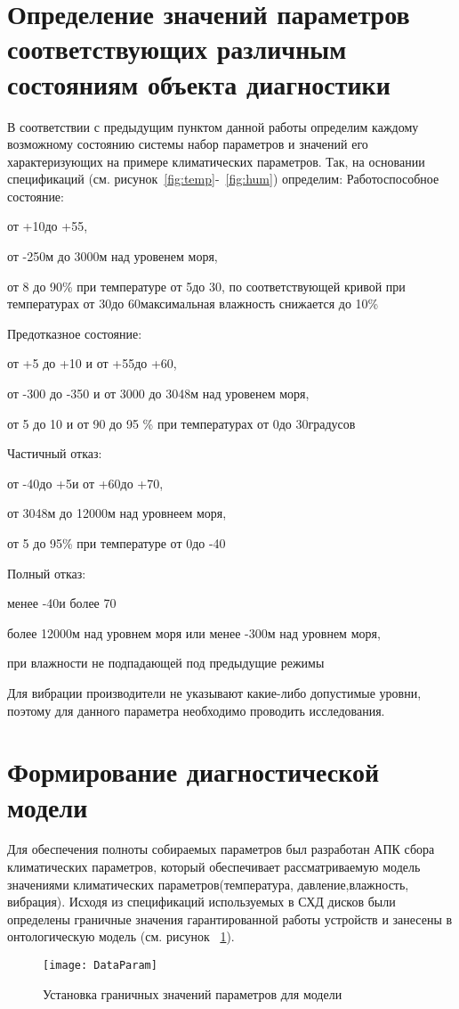 \section{Определение значений параметров соответствующих различным состояниям объекта диагностики}
В соответствии с предыдущим пунктом данной работы определим каждому возможному состоянию системы набор параметров и значений его характеризующих на примере климатических параметров. Так, на основании спецификаций (см. рисунок~\ref{fig:temp}-~\ref{fig:hum}) определим:
Работоспособное состояние:
\begin{itemize*}
	\item{от +10 до +55,}
	\item{от -250м до 3000м над уровенем моря},
	\item{от 8 до 90\% при температуре от 5 до 30, по соответствующей кривой при температурах от 30 до 60 максимальная влажность снижается до 10\%}
\end{itemize*} 
Предотказное состояние: 
\begin{itemize*}
\item{от +5 до +10 и от +55 до +60,}
\item{от -300 до -350 и от 3000 до 3048м над уровенем моря,}
\item{от 5 до 10 и от 90 до 95 \% при температурах от 0 до 30 градусов}
\end{itemize*} 
Частичный отказ: 
\begin{itemize*}
\item{от -40 до +5 и от +60 до +70,}
\item{от 3048м до 12000м над уровнеем моря, }
\item{ от 5 до 95\% при температуре от 0 до -40}
\end{itemize*} 
Полный отказ: 
\begin{itemize*}
\item{менее -40 и более 70}
\item{более 12000м над уровнем моря или менее -300м над уровнем моря,}
\item{при влажности не подпадающей под предыдущие режимы}
\end{itemize*} 

Для вибрации производители не указывают какие-либо допустимые уровни, поэтому для данного параметра необходимо проводить исследования.

\section{Формирование диагностической модели}
Для обеспечения полноты собираемых параметров был разработан АПК сбора климатических параметров, который обеспечивает рассматриваемую модель значениями климатических параметров(температура, давление,влажность, вибрация). Исходя из спецификаций используемых в СХД дисков были определены граничные значения гарантированной работы устройств и занесены в онтологическую модель (см. рисунок ~\ref{fig:DataParam}). 

\begin{figure}[h]
	\centering
	\texttt{[image: DataParam]}
	\caption{Установка граничных значений параметров для модели}
	\label{fig:DataParam}
\end{figure}